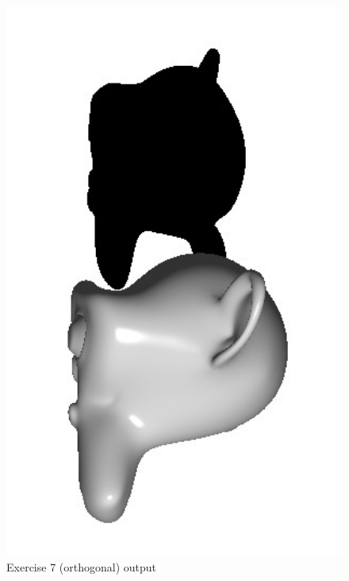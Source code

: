 \begin{figure}[ht!]
	\begin{center}
		\includegraphics[width=1.0\textwidth]{figures/exercise_7_ortho}
	\end{center}
	\vspace{-4.5ex}\caption{Exercise 7 (orthogonal) output}
	\label{fig:exercise_7_ortho} 
\end{figure}